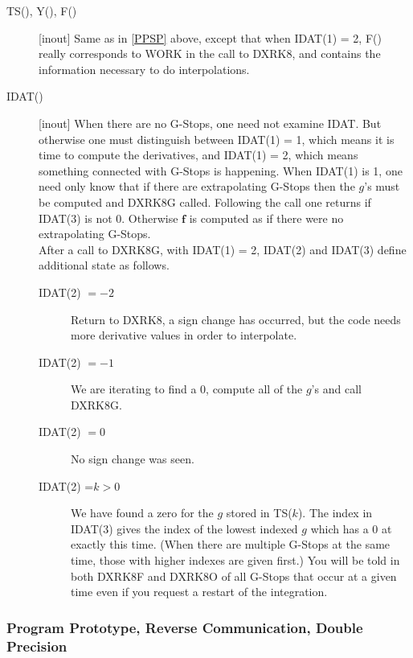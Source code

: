 \documentclass[twoside]{MATH77}
\begin{document}
\begin{description}
\item[TS(), Y(), F()] [inout] Same as in \ref{PPSP} above, except that
  when IDAT(1) = 2, F() really corresponds to WORK in the call to
  DXRK8, and contains the information necessary to do interpolations.

\item[IDAT()] [inout] When there are no G-Stops, one need not examine
  IDAT.  But otherwise one must distinguish between IDAT(1) = 1, which
  means it is time to compute the derivatives, and IDAT(1) = 2, which
  means something connected with G-Stops is happening.  When IDAT(1)
  is 1, one need only know that if there are extrapolating G-Stops
  then the $g$'s must be computed and DXRK8G called.  Following the
  call one returns if IDAT(3) is not 0.  Otherwise $\mathbf{f}$ is
  computed as if there were no extrapolating G-Stops.\\[5pt]
  After a call to DXRK8G, with IDAT(1) = 2, IDAT(2) and IDAT(3) define
  additional state as follows.\vspace{-5pt}
  \begin{description}
  \item[IDAT(2) $=-2$] Return to DXRK8, a sign change has occurred, but
    the code needs more derivative values in order to interpolate.
  \item[IDAT(2) $=-1$] We are iterating to find a 0, compute all of the
    $g$'s and call DXRK8G.
  \item[IDAT(2) $=0$] No sign change was seen.
  \item[IDAT(2) =$k>0$] We have found a zero for the $g$ stored in
    TS($k$).  The index in IDAT(3) gives the index of the lowest
    indexed $g$ which has a 0 at exactly this time.  (When there are
    multiple G-Stops at the same time, those with higher indexes are
    given first.)  You will be told in both DXRK8F and DXRK8O of all
    G-Stops that occur at a given time even if you request a restart
    of the integration.
  \end{description}
\end{description}

\subsubsection{Program Prototype, Reverse Communication, Double Precision%
\label{RevCom}}
\end{document}
